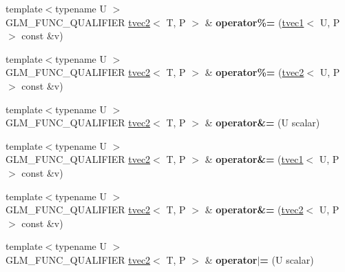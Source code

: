 \begin{DoxyCompactItemize}
\item 
\hypertarget{structglm_1_1tvec2_aea6f1233a9ef7b8c12cee037fa5f7b9d}{{\footnotesize template$<$typename U $>$ }\\G\-L\-M\-\_\-\-F\-U\-N\-C\-\_\-\-Q\-U\-A\-L\-I\-F\-I\-E\-R \hyperlink{structglm_1_1tvec2}{tvec2}$<$ T, P $>$ \& {\bfseries operator\%=} (\hyperlink{structglm_1_1tvec1}{tvec1}$<$ U, P $>$ const \&v)}\label{structglm_1_1tvec2_aea6f1233a9ef7b8c12cee037fa5f7b9d}

\item 
\hypertarget{structglm_1_1tvec2_aaf4c73ee8e801c26093def1d49df1df1}{{\footnotesize template$<$typename U $>$ }\\G\-L\-M\-\_\-\-F\-U\-N\-C\-\_\-\-Q\-U\-A\-L\-I\-F\-I\-E\-R \hyperlink{structglm_1_1tvec2}{tvec2}$<$ T, P $>$ \& {\bfseries operator\%=} (\hyperlink{structglm_1_1tvec2}{tvec2}$<$ U, P $>$ const \&v)}\label{structglm_1_1tvec2_aaf4c73ee8e801c26093def1d49df1df1}

\item 
\hypertarget{structglm_1_1tvec2_a8626374eefdd6f315306511248b3b261}{{\footnotesize template$<$typename U $>$ }\\G\-L\-M\-\_\-\-F\-U\-N\-C\-\_\-\-Q\-U\-A\-L\-I\-F\-I\-E\-R \hyperlink{structglm_1_1tvec2}{tvec2}$<$ T, P $>$ \& {\bfseries operator\&=} (U scalar)}\label{structglm_1_1tvec2_a8626374eefdd6f315306511248b3b261}

\item 
\hypertarget{structglm_1_1tvec2_a061aeb63e00510f372dc949c7ad5af98}{{\footnotesize template$<$typename U $>$ }\\G\-L\-M\-\_\-\-F\-U\-N\-C\-\_\-\-Q\-U\-A\-L\-I\-F\-I\-E\-R \hyperlink{structglm_1_1tvec2}{tvec2}$<$ T, P $>$ \& {\bfseries operator\&=} (\hyperlink{structglm_1_1tvec1}{tvec1}$<$ U, P $>$ const \&v)}\label{structglm_1_1tvec2_a061aeb63e00510f372dc949c7ad5af98}

\item 
\hypertarget{structglm_1_1tvec2_a9b368287482b9a3218f99cc238d0ac97}{{\footnotesize template$<$typename U $>$ }\\G\-L\-M\-\_\-\-F\-U\-N\-C\-\_\-\-Q\-U\-A\-L\-I\-F\-I\-E\-R \hyperlink{structglm_1_1tvec2}{tvec2}$<$ T, P $>$ \& {\bfseries operator\&=} (\hyperlink{structglm_1_1tvec2}{tvec2}$<$ U, P $>$ const \&v)}\label{structglm_1_1tvec2_a9b368287482b9a3218f99cc238d0ac97}

\item 
\hypertarget{structglm_1_1tvec2_a1eff9e49c1834396e38d1a59fb0ab910}{{\footnotesize template$<$typename U $>$ }\\G\-L\-M\-\_\-\-F\-U\-N\-C\-\_\-\-Q\-U\-A\-L\-I\-F\-I\-E\-R \hyperlink{structglm_1_1tvec2}{tvec2}$<$ T, P $>$ \& {\bfseries operator$\vert$=} (U scalar)}\label{structglm_1_1tvec2_a1eff9e49c1834396e38d1a59fb0ab910}


\end{DoxyCompactItemize}
